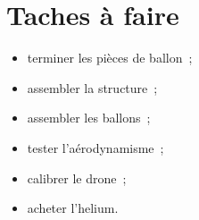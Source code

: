 \documentclass{beamer}
\begin{document}
\section{Taches à faire}
\begin{frame}
  \begin{itemize}
    \item terminer les pièces de ballon~;
    \item assembler la structure~;
    \item assembler les ballons~;
    \item tester l'aérodynamisme~;
    \item calibrer le drone~;
    \item acheter l'helium.
  \end{itemize}
\end{frame}
\end{document}
